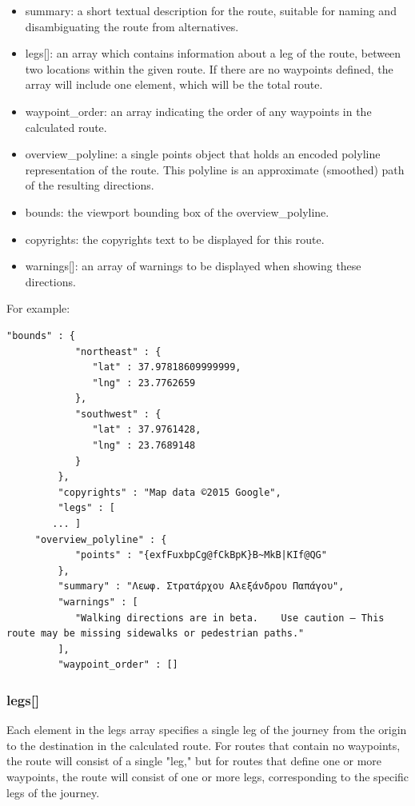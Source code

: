 \begin{itemize}
 \item summary: a short textual description for the route, suitable for naming and disambiguating the route from alternatives.
 \item legs[]: an array which contains information about a leg of the route, between two locations within the given route. If there are no 
 waypoints defined, the array will include one element, which will be the total route. 
 \item waypoint\_order: an array indicating the order of any waypoints in the calculated route. 
 \item overview\_polyline: a single points object that holds an encoded polyline representation of the route. This polyline is an approximate 
 (smoothed) path of the resulting directions.
 \item bounds: the viewport bounding box of the overview\_polyline.
 \item copyrights: the copyrights text to be displayed for this route. 
 \item warnings[]: an array of warnings to be displayed when showing these directions.
\end{itemize}

For example:

\begin{lstlisting}[basicstyle=\footnotesize\ttfamily, breaklines=true]
	"bounds" : {
            "northeast" : {
               "lat" : 37.97818609999999,
               "lng" : 23.7762659
            },
            "southwest" : {
               "lat" : 37.9761428,
               "lng" : 23.7689148
            }
         },
         "copyrights" : "Map data ©2015 Google",
         "legs" : [
	    ... ]
	 "overview_polyline" : {
            "points" : "{exfFuxbpCg@fCkBpK}B~MkB|KIf@QG"
         },
         "summary" : "Λεωφ. Στρατάρχου Αλεξάνδρου Παπάγου",
         "warnings" : [
            "Walking directions are in beta.    Use caution – This route may be missing sidewalks or pedestrian paths."
         ],
         "waypoint_order" : []   
\end{lstlisting}

\subsubsection{legs[]}

Each element in the legs array specifies a single leg of the journey from the origin to the destination in the calculated route. For routes that contain 
no waypoints, the route will consist of a single "leg," but for routes that define one or more waypoints, the route will consist of one or more legs, 
corresponding to the specific legs of the journey.

